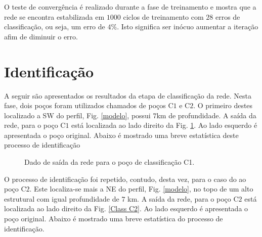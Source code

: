 O teste de convergência é realizado durante a fase de treinamento e mostra que a rede se encontra estabilizada em  $1000$ ciclos de treinamento com $28$ erros de classificação, ou seja, um erro de $4\%$. Isto significa ser inócuo aumentar a iteração afim de diminuir o erro. 



\section{Identificação}

A seguir são apresentados os resultados da etapa de classificação da rede. Nesta fase, dois poços foram utilizados chamados de poços C$1$ e C$2$. O primeiro destes localizado a SW do perfil, Fig. \ref{modelo}, possui $7$km de profundidade. A saída da rede, para o poço C$1$ está localizada ao lado direito da Fig. \ref{Class C1}. Ao lado esquerdo é apresentada o poço original. Abaixo é mostrado uma breve estatística deste processo de identificação 


\begin{figure}[H]
	\centering
	\setlength{\fboxsep}{8pt}
	\setlength{\fboxrule}{0.1pt}
	\caption{Dado de saída da rede para o poço de classificação C1.}
	\label{Class C1}
\end{figure} 


O processo de identificação foi repetido, contudo, desta vez, para o caso do ao poço C$2$. Este localiza-se mais a NE do perfil, Fig. \ref{modelo}, no topo de um alto estrutural com igual profundidade de $7$ km. A saída da rede, para o poço C$2$ está localizada ao lado direito da Fig. \ref{Class C2}. Ao lado esquerdo é apresentada o poço original. Abaixo é mostrado uma breve estatística do processo de identificação.   



